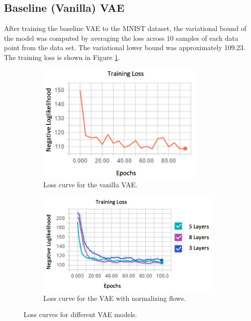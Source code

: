 \documentclass{article}
\begin{document}
\subsection{Baseline (Vanilla) VAE}
After training the baseline VAE to the MNIST dataset, the variational bound of the model was computed
by averaging the loss across 10 samples of each data point from the data set. The variational lower bound
was approximately 109.23. The training loss is shown in Figure \ref{fig:BaselineLoss}.

\begin{figure}[htbp]\hspace{-2.5em}
\begin{subfigure}{0.5\textwidth}
\begin{center}
	\includegraphics[width=0.9\textwidth]{BaselineLoss.png}
\caption{Loss curve for the vanilla VAE.}
\label{fig:BaselineLoss}
\end{center}
\end{subfigure}
\begin{subfigure}{0.5\textwidth}
\vspace{-2.3em}
\hspace{1em}
\begin{center}
	\includegraphics[width=1.2\textwidth]{NormFlowLoss.png}
\caption{Loss curve for the VAE with normalizing flows.}
\label{fig:NormFlowLoss}
\end{center}
\end{subfigure}
\caption{Loss curves for different VAE models.}
\vspace{-1em}
\end{figure}
\end{document}
